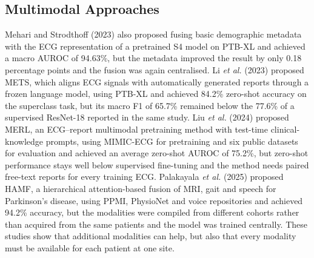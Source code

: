 \subsection{Multimodal Approaches}
Mehari and Strodthoff (2023) \cite{mehari2023s4} also proposed fusing basic demographic metadata
with the ECG representation of a pretrained S4 model on PTB-XL and achieved a macro AUROC of
94.63\%, but the metadata improved the result by only 0.18 percentage points and the fusion was
again centralised. Li \textit{et al.} (2023) \cite{li2023mets} proposed METS, which aligns ECG
signals with automatically generated reports through a frozen language model, using PTB-XL and
achieved 84.2\% zero-shot accuracy on the superclass task, but its macro F1 of 65.7\% remained below
the 77.6\% of a supervised ResNet-18 reported in the same study. Liu \textit{et al.} (2024)
\cite{liu2024merl} proposed MERL, an ECG--report multimodal pretraining method with test-time
clinical-knowledge prompts, using MIMIC-ECG for pretraining and six public datasets for evaluation
and achieved an average zero-shot AUROC of 75.2\%, but zero-shot performance stays well below
supervised fine-tuning and the method needs paired free-text reports for every training ECG.
Palakayala \textit{et al.} (2025) \cite{palakayala2025hamf} proposed HAMF, a hierarchical
attention-based fusion of MRI, gait and speech for Parkinson's disease, using PPMI, PhysioNet and
voice repositories and achieved 94.2\% accuracy, but the modalities were compiled from different
cohorts rather than acquired from the same patients and the model was trained centrally. These
studies show that additional modalities can help, but also that every modality must be available
for each patient at one site.

